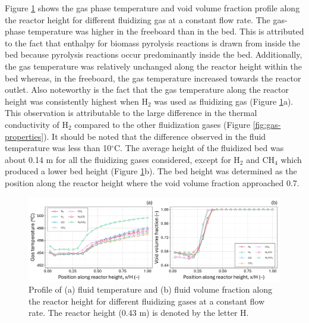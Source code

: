 \documentclass{article}
\begin{document}
Figure \ref{fig:cfd-temp-void-biooil} shows the gas phase temperature and void volume fraction profile along the reactor height for different fluidizing gas at a constant flow rate. The gas-phase temperature was higher in the freeboard than in the bed. This is attributed to the fact that enthalpy for biomass pyrolysis reactions is drawn from inside the bed because pyrolysis reactions occur predominantly inside the bed. Additionally, the gas temperature was relatively unchanged along the reactor height within the bed whereas, in the freeboard, the gas temperature increased towards the reactor outlet. Also noteworthy is the fact that the gas temperature along the reactor height was consistently highest when H$_2$ was used as fluidizing gas (Figure \ref{fig:cfd-temp-void-biooil}a). This observation is attributable to the large difference in the thermal conductivity of H$_2$ compared to the other fluidization gases (Figure \ref{fig:gas-properties}). It should be noted that the difference observed in the fluid temperature was less than 10$^{\circ}$C. The average height of the fluidized bed was about 0.14 m for all the fluidizing gases considered, except for H$_2$ and CH$_4$ which produced a lower bed height (Figure \ref{fig:cfd-temp-void-biooil}b). The bed height was determined as the position along the reactor height where the void volume fraction approached 0.7.

\begin{figure}[H]
    \centering
    \includegraphics[width=1.0\textwidth]{figures/cfd-temp-void-biooil.pdf}
    \caption{Profile of (a) fluid temperature and (b) fluid volume fraction along the reactor height for different fluidizing gases at a constant flow rate. The reactor height (0.43 m) is denoted by the letter H.}
    \label{fig:cfd-temp-void-biooil}
\end{figure}
\end{document}
